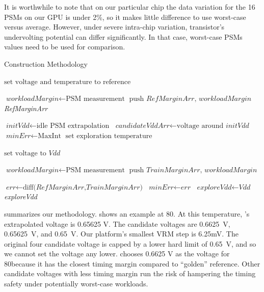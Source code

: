 It is worthwhile to note that on our particular chip the data variation for the 16 PSMs on our GPU is under 2\%, so it makes little difference to use worst-case versus average. However, under severe intra-chip variation, transistor's undervolting potential can differ significantly. In that case, worst-case PSMs values need to be used for comparison.


\begin{algorithm}[h]
\caption{\tistate Construction Methodology}
\label{train-algo}
\begin{algorithmic}[1]
\State $\text{set voltage and temperature to reference}$ 

\State $\textit{workloadMargin} \gets \text{PSM measurement}$
\State $\text{push } \textit{RefMarginArr}\text{, }\textit{workloadMargin}$ 
\EndFor
\Return \textit{RefMarginArr}
\EndProcedure

\State $\textit{initVdd} \gets \text{idle PSM extrapolation}$ 
\State $\textit{candidateVddArr} \gets \text{voltage around }\textit{initVdd}$
\State $\textit{minErr} \gets \text{MaxInt}$ 
\State $\text{set exploration temperature}$

\State $\text{set voltage to } \textit{Vdd}$

\State $\textit{workloadMargin} \gets \text{PSM measurement}$
\State $\text{push } \textit{TrainMarginArr}\text{, }\textit{workloadMargin}$ 
\EndFor

\State $\textit{err} \gets \text{diff(}\textit{RefMarginArr}\text{,}\textit{TrainMarginArr}\text{)}$
\State $\textit{minErr} \gets \textit{err}$
\State $\textit{exploreVdd} \gets \textit{Vdd}$
\EndIf
\EndFor
\Return \textit{exploreVdd}
\EndProcedure

\end{algorithmic}
\end{algorithm}

 summarizes our methodology.  shows an example at 80\C. At this temperature, 's extrapolated voltage is 0.65625 V. The candidate voltages are 0.6625~V, 0.65625~V, and 0.65~V. Our platform's smallest VRM step is 6.25mV. The original four candidate voltage is capped by a lower hard limit of 0.65~V, and so we cannot set the voltage any lower.  chooses 0.6625 V as the \tistate voltage for 80\C because it has the closest timing margin compared to ``golden'' reference. Other candidate voltages with less timing margin run the risk of hampering the timing safety under potentially worst-case workloads.


